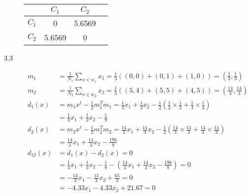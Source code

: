 \documentclass[fleqn]{article}
\begin{document}
\begin{description}
    \begin{tabular}{ l c c c }
        & \begin{math}C_1\end{math} & \begin{math}C_2\end{math} \\
        \hline
        \begin{math}C_1\end{math} & 0      & 5.6569 \\
        \begin{math}C_2\end{math} & 5.6569 & 0      \\
    \end{tabular}

\item [3.3]
    \begin{align*}
        m_1 &= \frac{1}{N_1} \sum_{x \in w_1}{x_1} = \frac{1}{3} \left ( (0,0) + (0,1) + (1,0) \right ) = (\frac{1}{3}, \frac{1}{3}) \\
        m_2 &= \frac{1}{N_2}\sum_{x \in w_2}{x_2} = \frac{1}{3} \left ( (5,4) + (5,5) + (4,5) \right ) = (\frac{14}{3}, \frac{14}{3}) \\
        d_1(x) &= m_1x^t - \frac{1}{2}m_1^Tm_1 = \frac{1}{3}x_1 + \frac{1}{3}x_2 - \frac{1}{2} \left ( \frac{1}{3} \times \frac{1}{3} + \frac{1}{3} \times \frac{1}{3} \right ) \\
               &= \frac{1}{3}x_1 + \frac{1}{3}x_2 - \frac{1}{9} \\
        d_2(x) &= m_2x^t - \frac{1}{2}m_2^Tm_2 = \frac{14}{3}x_1 + \frac{14}{3}x_2 - \frac{1}{2} \left ( \frac{14}{3} \times \frac{14}{3} + \frac{14}{3} \times \frac{14}{3} \right ) \\
               &= \frac{14}{3}x_1 + \frac{14}{3}x_2 - \frac{196}{9} \\
        d_{12}(x) &= d_1(x) - d_2(x) = 0 \\
                  &= \frac{1}{3}x_1 + \frac{1}{3}x_2 - \frac{1}{9} - \left (\frac{14}{3}x_1 + \frac{14}{3}x_2 - \frac{196}{9} \right ) = 0 \\
                  &= -\frac{13}{3}x_1 - \frac{13}{3}x_2 + \frac{65}{3} = 0 \\
                  &= -4.33x_1 - 4.33x_2 + 21.67 = 0
    \end{align*}

\end{description}
\end{document}
